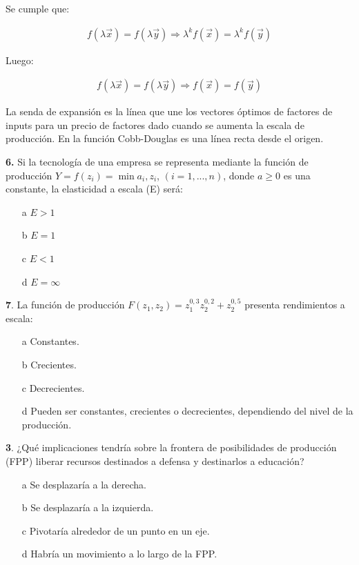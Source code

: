 \documentclass{nuevotema}
\begin{document}
Se cumple que:

\begin{align}
	f(\lambda \vec{x}) = f(\lambda \vec{y}) \Rightarrow \lambda^k f(\vec{x}) = \lambda^k f(\vec{y})
\end{align}

Luego:

\begin{align}
	f(\lambda \vec{x}) = f(\lambda \vec{y}) \Rightarrow f(\vec{x}) = f(\vec{y})
\end{align}



La senda de expansión es la línea que une los vectores óptimos de factores de inputs para un precio de factores dado cuando se aumenta la escala de producción. En la función Cobb-Douglas es una línea recta desde el origen.



\preguntas

\textbf{6.} Si la tecnología de una empresa se representa mediante la función de producción $Y=f(z_i) = \min{a_i, z_i}$, $(i=1, ..., n)$, donde $a\geq 0$ es una constante, la elasticidad a escala (E) será:

\begin{itemize}
	\item[a] $E > 1$
	\item[b] $E=1$
	\item[c] $E<1$
	\item[d] $E=\infty$
\end{itemize}

\textbf{7}. La función de producción $F(z_1, z_2) = z_1^{0,3} z_2^{0,2} + z_2^{0,5}$ presenta rendimientos a escala:

\begin{enumerate}
	\item[a] Constantes.
	\item[b] Crecientes.
	\item[c] Decrecientes.
	\item[d] Pueden ser constantes, crecientes o decrecientes, dependiendo del nivel de la producción.
\end{enumerate}


\textbf{3}. ¿Qué implicaciones tendría sobre la frontera de posibilidades de producción (FPP) liberar recursos destinados a defensa y destinarlos a educación?

\begin{enumerate}
	\item[a] Se desplazaría a la derecha.
	\item[b] Se desplazaría a la izquierda.
	\item[c] Pivotaría alrededor de un punto en un eje.
	\item[d] Habría un movimiento a lo largo de la FPP.
\end{enumerate}
\end{document}
